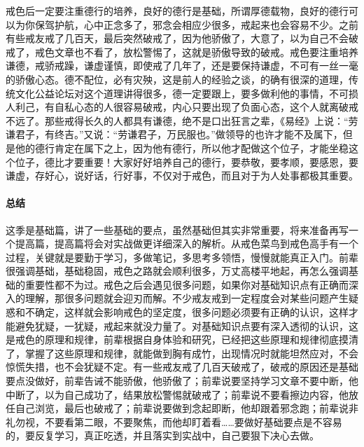 戒色后一定要注重德行的培养，良好的德行是基础，所谓厚德载物，良好的德行可以为你保驾护航，心中正念多了，邪念会相应少很多，戒起来也会容易不少。之前有些戒友戒了几百天，最后突然破戒了，因为他骄傲了，大意了，以为自己不会破戒了，戒色文章也不看了，放松警惕了，这就是骄傲导致的破戒。戒色要注重培养谦德，戒骄戒躁，谦虚谨慎，即使戒了几年了，还是要保持谦虚，不可有一丝一毫的骄傲心态。德不配位，必有灾殃，这是前人的经验之谈，的确有很深的道理，传统文化公益论坛对这个道理讲得很多，德一定要跟上，要多做利他的事情，不可损人利己，有自私心态的人很容易破戒，内心只要出现了负面心态，这个人就离破戒不远了。那些戒得长久的人都具有谦德，绝不是口出狂言之辈，《易经》上说：“劳谦君子，有终吉。”又说：“劳谦君子，万民服也。”做领导的也许才能不及属下，但是他的德行肯定在属下之上，因为他有德行，所以他才配做这个位子，才能坐稳这个位子，德比才要重要！大家好好培养自己的德行，要恭敬，要孝顺，要感恩，要谦虚，存好心，说好话，行好事，不仅对于戒色，而且对于为人处事都极其重要。

\paragraph{总结}

这季是基础篇，讲了一些基础的要点，虽然基础但其实非常重要，将来准备再写一个提高篇，提高篇将会对实战做更详细深入的解析。从戒色菜鸟到戒色高手有一个过程，关键就是要勤于学习，多做笔记，多思考多领悟，慢慢就能真正入门。前辈很强调基础，基础稳固，戒色之路就会顺利很多，万丈高楼平地起，再怎么强调基础的重要性都不为过。戒色之后会遇见很多问题，如果你对基础知识点有正确而深入的理解，那很多问题就会迎刃而解。不少戒友戒到一定程度会对某些问题产生疑惑和不确定，这样就会影响戒色的坚定度，很多问题必须要有正确的认识，这样才能避免犹疑，一犹疑，戒起来就没力量了。对基础知识点要有深入透彻的认识，这是戒色的原理和规律，前辈根据自身体验和研究，已经把这些原理和规律彻底摸清了，掌握了这些原理和规律，就能做到胸有成竹，出现情况时就能坦然应对，不会惊慌失措，也不会犹疑不定。有一些戒友戒了几百天破戒了，破戒的原因还是基础要点没做好，前辈告诫不能骄傲，他骄傲了；前辈说要坚持学习文章不要中断，他中断了，以为自己成功了，结果放松警惕就破戒了；前辈说不要看擦边内容，他放任自己浏览，最后也破戒了；前辈说要做到念起即断，他却跟着邪念跑；前辈说非礼勿视，不要看第二眼，不要聚焦，而他却盯着看……要做好基础要点是不容易的，要反复学习，真正吃透，并且落实到实战中，自己要狠下决心去做。

